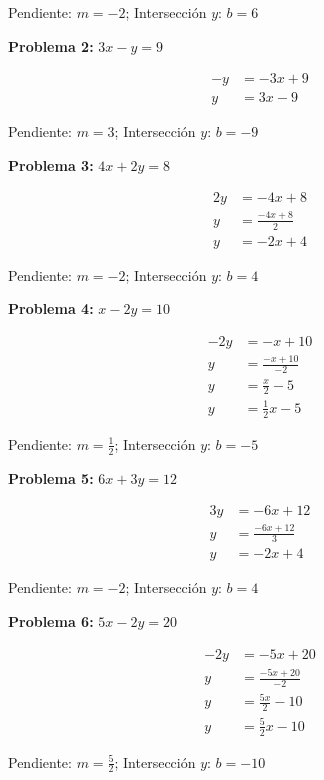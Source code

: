 Pendiente: $m = -2$; Intersección $y$: $b = 6$

\medskip

\textbf{Problema 2:} $3x - y = 9$

\begin{align*}
-y &= -3x + 9 \\
y &= 3x - 9
\end{align*}

Pendiente: $m = 3$; Intersección $y$: $b = -9$

\medskip

\textbf{Problema 3:} $4x + 2y = 8$

\begin{align*}
2y &= -4x + 8 \\
y &= \frac{-4x + 8}{2} \\
y &= -2x + 4
\end{align*}

Pendiente: $m = -2$; Intersección $y$: $b = 4$

\medskip

\textbf{Problema 4:} $x - 2y = 10$

\begin{align*}
-2y &= -x + 10 \\
y &= \frac{-x + 10}{-2} \\
y &= \frac{x}{2} - 5 \\
y &= \frac{1}{2}x - 5
\end{align*}

Pendiente: $m = \frac{1}{2}$; Intersección $y$: $b = -5$

\medskip

\textbf{Problema 5:} $6x + 3y = 12$

\begin{align*}
3y &= -6x + 12 \\
y &= \frac{-6x + 12}{3} \\
y &= -2x + 4
\end{align*}

Pendiente: $m = -2$; Intersección $y$: $b = 4$

\medskip

\textbf{Problema 6:} $5x - 2y = 20$

\begin{align*}
-2y &= -5x + 20 \\
y &= \frac{-5x + 20}{-2} \\
y &= \frac{5x}{2} - 10 \\
y &= \frac{5}{2}x - 10
\end{align*}

Pendiente: $m = \frac{5}{2}$; Intersección $y$: $b = -10$

